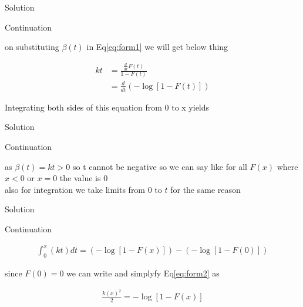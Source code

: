 \documentclass{beamer}
\providecommand{\brak}[1]{\ensuremath{\left(#1\right)}}
\begin{document}
\begin{frame}{Solution}

            \begin{block}{Continuation}
            
                  on substituting $\beta(t)$ in Eq\eqref{eq:form1} we will get below thing
                  
                    \begin{align}
                         kt &= \frac{ \frac{d}{dt}F(t) }{1 - F(t)} \\
                            &= \frac{d}{dt}\brak{ -\log[1-F(t)]} 
                    \end{align}
                    
                  Integrating both sides of this equation from 0 to x yields


                
            \end{block}
    
\end{frame}



\begin{frame}{Solution}
   
            \begin{block}{Continuation}
               
                as $\beta(t) = kt > 0 $ so t cannot be negative so we can say like for all $F(x)$ where $x < 0 $ or $ x = 0 $ the value is $0$ \\
                also for integration we take limits from $0$ to $t$ for the same reason 
            
            \end{block}
    
\end{frame}



\begin{frame}{Solution}

            \begin{block}{Continuation}
                  
                    \begin{align}
                       \int_{0}^{x}(kt) dt = \brak{-\log[1-F(x)]} - \brak{-\log[1-F(0)]} 
                       \label{eq:form2}
                    \end{align}
                    
                    since $ F(0)  = 0 $ we can write and simplyfy Eq\eqref{eq:form2} as
                    
                    \begin{align}
                        \frac{k(x)^{2}}{2} = -\log[1-F(x)] 
                        \label{eq:form3}
                    \end{align}
                
            \end{block}
    
\end{frame}
\end{document}
